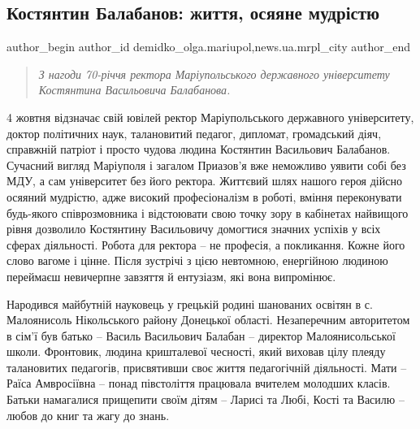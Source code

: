  
 
 
 
 
 
\subsection{\large Костянтин Балабанов: життя, осяяне мудрістю}
\label{sec:29_09_2019.stz.news.ua.mrpl_city.1.kostjantyn_balabanov_zhyttja_mudrist}
 
\ifcmt
 author_begin
   author_id demidko_olga.mariupol,news.ua.mrpl_city
 author_end
\fi

\begin{quote}
\em З нагоди 70-річчя ректора Маріупольського державного університету Костянтина
Васильовича Балабанова.	
\end{quote}


4 жовтня відзначає свій ювілей ректор Маріупольського державного університету,
доктор політичних наук, талановитий педагог, дипломат, громадський діяч,
справжній патріот і просто чудова людина Костянтин Васильович Балабанов.
Сучасний вигляд Маріуполя і загалом Приазов'я вже неможливо уявити собі без
МДУ, а сам університет без його ректора. Життєвий шлях нашого героя дійсно
осяяний мудрістю, адже високий професіоналізм в роботі, вміння переконувати
будь-якого співрозмовника і відстоювати свою точку зору в кабінетах найвищого
рівня дозволило Костянтину Васильовичу домогтися значних успіхів у всіх сферах
діяльності. Робота для ректора – не професія, а покликання. Кожне його слово
вагоме і цінне. Після зустрічі з цією невтомною, енергійною людиною переймаєш
невичерпне завзяття й ентузіазм, які вона випромінює.


Народився майбутній науковець у грецькій родині шанованих освітян в с.
Малоянисоль Нікольського району Донецької області. Незаперечним авторитетом в
сім'ї був батько – Василь Васильович Балабан – директор Малоянисольської школи.
Фронтовик, людина кришталевої чесності, який виховав цілу плеяду талановитих
педагогів, присвятивши своє життя педагогічній діяльності. Мати – Раїса
Амвросіївна – понад півстоліття працювала вчителем молодших класів. Батьки
намагалися прищепити своїм дітям – Ларисі та Любі, Кості та Василю – любов до
книг та жагу до знань.

